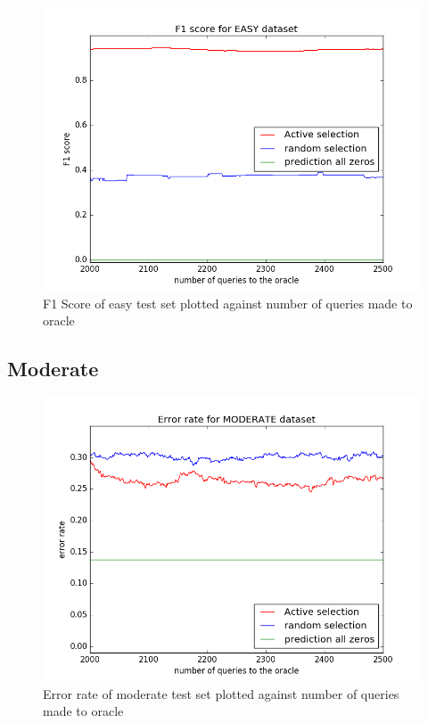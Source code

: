 \documentclass[paper=a4, fontsize=11pt]{scrartcl}
\numberwithin{equation}{section}    %
\numberwithin{figure}{section}      %
\numberwithin{table}{section}       %
\numberwithin{equation}{section}    %
\numberwithin{figure}{section}      %
\numberwithin{table}{section}       %
\begin{document}
\begin{figure}[!htb]
  \centering
  \includegraphics[scale = 0.5]{figures/f1_easy.png}
      \caption{F1 Score of easy test set plotted against number of queries made to oracle}
      \label{easyf}
\end{figure}



\FloatBarrier
\subsection{Moderate}

\begin{figure}[!htb]
  \centering
  \includegraphics[scale = 0.5]{figures/error_moderate.png}
      \caption{Error rate of moderate test set plotted against number of queries made to oracle}
      \label{moderror}
\end{figure}
\end{document}
